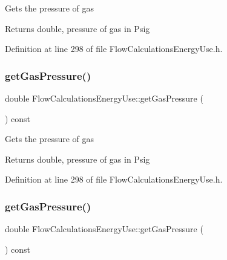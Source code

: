 Gets the pressure of gas

\begin{DoxyReturn}{Returns}
double, pressure of gas in Psig 
\end{DoxyReturn}


Definition at line 298 of file Flow\+Calculations\+Energy\+Use.\+h.

\mbox{\label{class_flow_calculations_energy_use_af98e97bce88915e6fdd7a0caf837049c}} 
\subsubsection{\texorpdfstring{get\+Gas\+Pressure()}{getGasPressure()}\hspace{0.1cm}{\footnotesize\ttfamily [2/3]}}
{\footnotesize\ttfamily double Flow\+Calculations\+Energy\+Use\+::get\+Gas\+Pressure (\begin{DoxyParamCaption}{ }\end{DoxyParamCaption}) const\hspace{0.3cm}{\ttfamily [inline]}}

Gets the pressure of gas

\begin{DoxyReturn}{Returns}
double, pressure of gas in Psig 
\end{DoxyReturn}


Definition at line 298 of file Flow\+Calculations\+Energy\+Use.\+h.

\mbox{\label{class_flow_calculations_energy_use_af98e97bce88915e6fdd7a0caf837049c}} 
\subsubsection{\texorpdfstring{get\+Gas\+Pressure()}{getGasPressure()}\hspace{0.1cm}{\footnotesize\ttfamily [3/3]}}
{\footnotesize\ttfamily double Flow\+Calculations\+Energy\+Use\+::get\+Gas\+Pressure (\begin{DoxyParamCaption}{ }\end{DoxyParamCaption}) const\hspace{0.3cm}{\ttfamily [inline]}}

